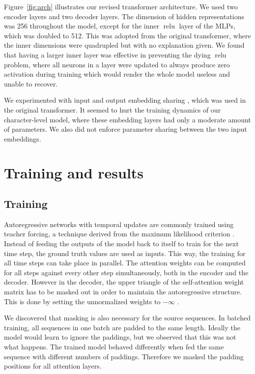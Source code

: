 \documentclass[11pt,twocolumn]{article}
\DeclareMathOperator{\relu}{relu}
\begin{document}
Figure~\ref{fig:arch} illustrates our revised transformer architecture.
We used two encoder layers and two decoder layers.
The dimension of hidden representations was 256 throughout the model,
except for the inner \(\relu\) layer of the MLPs,
which was doubled to 512.
This was adopted from the original transformer,
where the inner dimensions were quadrupled but with no explanation given.
We found that having a larger inner layer was effective in preventing the dying \(\relu\) problem,
where all neurons in a layer were updated to always produce zero activation during training
which would render the whole model useless and unable to recover.

We experimented with input and output embedding sharing \parencite{press2016using},
which was used in the original transformer.
It seemed to hurt the training dynamics of our character-level model,
where these embedding layers had only a moderate amount of parameters.
We also did not enforce parameter sharing between the two input embeddings.

\section{Training and results}%
\label{sec:results}

\subsection{Training}

Autoregressive networks with temporal updates are commonly trained using teacher forcing,
a technique derived from the maximum likelihood criterion \parencite{williams1989learning}.
Instead of feeding the outputs of the model back to itself to train for the next time step,
the ground truth values are used as inputs.
This way, the training for all time steps can take place in parallel.
The attention weights can be computed for all steps against every other step simultaneously,
both in the encoder and the decoder.
However in the decoder, the upper triangle of the self-attention weight matrix has to be masked out
in order to maintain the autoregressive structure.
This is done by setting the unnormalized weights to \(- \infty\) \parencite{vaswani2017attention}.

We discovered that masking is also necessary for the source sequences.
In batched training, all sequences in one batch are padded to the same length.
Ideally the model would learn to ignore the paddings,
but we observed that this was not what happens.
The trained model behaved differently when fed the same sequence with different numbers of paddings.
Therefore we masked the padding positions for all attention layers.
\end{document}
